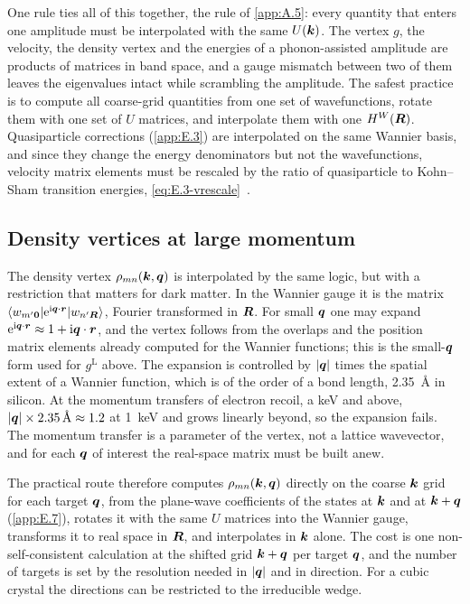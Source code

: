 One rule ties all of this together, the rule of \cref{app:A.5}: every quantity that enters one amplitude must be interpolated with the same $U(\bm{k})$. The vertex $g$, the velocity, the density vertex and the energies of a phonon-assisted amplitude are products of matrices in band space, and a gauge mismatch between two of them leaves the eigenvalues intact while scrambling the amplitude. The safest practice is to compute all coarse-grid quantities from one set of wavefunctions, rotate them with one set of $U$ matrices, and interpolate them with one $H^W(\bm{R})$. Quasiparticle corrections (\cref{app:E.3}) are interpolated on the same Wannier basis, and since they change the energy denominators but not the wavefunctions, velocity matrix elements must be rescaled by the ratio of quasiparticle to Kohn--Sham transition energies, \cref{eq:E.3-vrescale}~\cite{noffsinger2012phonon}.

\subsection{Density vertices at large momentum}

The density vertex $\rho_{mn}(\bm{k},\bm{q})$ is interpolated by the same logic, but with a restriction that matters for dark matter. In the Wannier gauge it is the matrix $\langle w_{m'\bm{0}}|\mathrm{e}^{\mathrm{i}\bm{q}\cdot\bm{r}}|w_{n'\bm{R}}\rangle$, Fourier transformed in $\bm{R}$. For small $\bm{q}$ one may expand $\mathrm{e}^{\mathrm{i}\bm{q}\cdot\bm{r}} \approx 1 + \mathrm{i}\bm{q}\cdot\bm{r}$, and the vertex follows from the overlaps and the position matrix elements already computed for the Wannier functions; this is the small-$\bm{q}$ form used for $g^{\mathrm{L}}$ above. The expansion is controlled by $|\bm{q}|$ times the spatial extent of a Wannier function, which is of the order of a bond length, \SI{2.35}{\angstrom} in silicon. At the momentum transfers of electron recoil, a keV and above, $|\bm{q}|\times\SI{2.35}{\angstrom} \approx 1.2$ at \SI{1}{keV} and grows linearly beyond, so the expansion fails. The momentum transfer is a parameter of the vertex, not a lattice wavevector, and for each $\bm{q}$ of interest the real-space matrix must be built anew.

The practical route therefore computes $\rho_{mn}(\bm{k},\bm{q})$ directly on the coarse $\bm{k}$ grid for each target $\bm{q}$, from the plane-wave coefficients of the states at $\bm{k}$ and at $\bm{k}+\bm{q}$ (\cref{app:E.7}), rotates it with the same $U$ matrices into the Wannier gauge, transforms it to real space in $\bm{R}$, and interpolates in $\bm{k}$ alone. The cost is one non-self-consistent calculation at the shifted grid $\bm{k}+\bm{q}$ per target $\bm{q}$, and the number of targets is set by the resolution needed in $|\bm{q}|$ and in direction. For a cubic crystal the directions can be restricted to the irreducible wedge.

